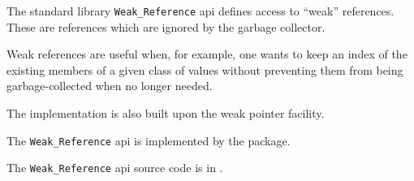 
The standard library {\tt Weak\_Reference} api defines access to ``weak'' references.  These 
are references which are ignored by the garbage collector.

Weak references are useful when, for example, 
one wants to keep an index of the existing members of a given class of values without preventing 
them from being garbage-collected when no longer needed.

The  implementation is also built upon the weak pointer facility.

The {\tt Weak\_Reference} api is implemented by the  
 package.

The {\tt Weak\_Reference} api source code is in .
